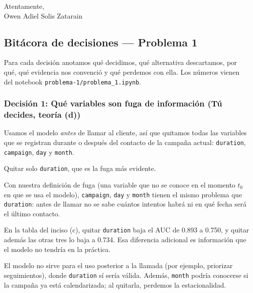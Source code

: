 \documentclass[11pt, letterpaper]{article}
\begin{document}
\medskip
\noindent Atentamente,\\
Owen Adiel Solis Zatarain

\subsection{Bitácora de decisiones — Problema 1}
\sloppy
Para cada decisión anotamos qué decidimos, qué alternativa descartamos, por qué, qué evidencia nos convenció y qué perdemos con ella. Los números vienen del notebook \texttt{problema-1/problema\_1.ipynb}.

\subsubsection*{Decisión 1: Qué variables son fuga de información (Tú decides, teoría (d))}
\begin{description}[leftmargin=0pt, itemsep=2pt]
    \item[Decisión.] Usamos el modelo \emph{antes} de llamar al cliente, así que quitamos todas las variables que se registran durante o después del contacto de la campaña actual: \texttt{duration}, \texttt{campaign}, \texttt{day} y \texttt{month}.
    \item[Alternativa descartada.] Quitar solo \texttt{duration}, que es la fuga más evidente.
    \item[Por qué.] Con nuestra definición de fuga (una variable que no se conoce en el momento $t_0$ en que se usa el modelo), \texttt{campaign}, \texttt{day} y \texttt{month} tienen el mismo problema que \texttt{duration}: antes de llamar no se sabe cuántos intentos habrá ni en qué fecha será el último contacto.
    \item[Evidencia.] En la tabla del inciso (c), quitar \texttt{duration} baja el AUC de 0.893 a 0.750, y quitar además las otras tres lo baja a 0.734. Esa diferencia adicional es información que el modelo no tendría en la práctica.
    \item[Qué perdemos.] El modelo no sirve para el uso posterior a la llamada (por ejemplo, priorizar seguimientos), donde \texttt{duration} sí sería válida. Además, \texttt{month} podría conocerse si la campaña ya está calendarizada; al quitarla, perdemos la estacionalidad.
\end{description}
\end{document}
